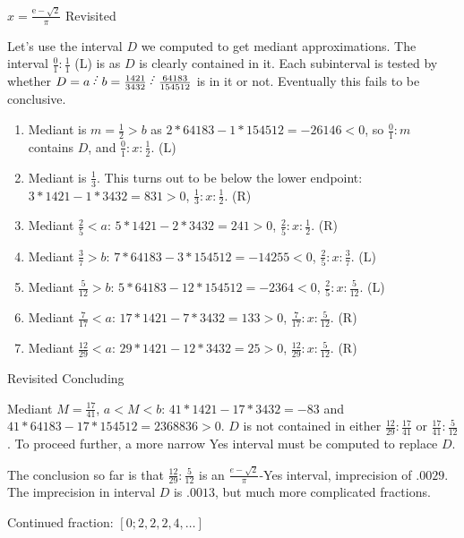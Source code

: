 \documentclass{beamer}
\begin{document}
\begin{frame}{$x = \frac{\mathrm{e} -\sqrt{2}}{\pi}$ Revisited}

Let's use the interval $D$ we computed to get mediant approximations. The interval $\frac{0}{1}:\frac{1}{1}$ (L) is as $D$ is clearly contained in it. Each subinterval is tested by whether $D= a\lte b =  \frac{1421}{3432} \lte \frac{64183}{154512}$ is in it or not. Eventually this fails to be conclusive. 

\begin{enumerate}
\item Mediant is $m = \frac{1}{2} > b$ as $2*64183 - 1*154512 = -26146 < 0$,  so $\frac{0}{1}:m$ contains $D$, and $\frac{0}{1}: x :\frac{1}{2}$. (L)
\item Mediant is $\frac{1}{3}$. This turns out to be below the lower endpoint:  $3*1421 - 1*3432 = 831>0$,   $\frac{1}{3}: x : \frac{1}{2}$. (R)
\item Mediant $\frac{2}{5} < a$: $5*1421 - 2*3432 = 241 > 0$, $\frac{2}{5}: x:\frac{1}{2}$. (R)
\item Mediant $\frac{3}{7} > b$: $7*64183- 3*154512 = -14255 < 0$, $\frac{2}{5}: x :\frac{3}{7}$. (L)
\item Mediant  $\frac{5}{12} > b$: $5*64183 - 12*154512 = -2364 < 0$, $\frac{2}{5}: x : \frac{5}{12}$. (L)
\item Mediant $\frac{7}{17}< a$: $17*1421 - 7*3432 = 133 > 0$, $\frac{7}{17}: x : \frac{5}{12}$. (R)
\item Mediant $\frac{12}{29}<a$: $29*1421 - 12*3432 = 25 > 0$, $\frac{12}{29}: x : \frac{5}{12}$. (R)

\end{enumerate}

\end{frame}

\begin{frame}{Revisited Concluding}
    
Mediant $M = \frac{17}{41}$, $a < M < b$: $41*1421-17*3432 = -83$ and $41*64183-17*154512 = 2368836 >0$. $D$ is not contained in either $\frac{12}{29}: \frac{17}{41}$ or $\frac{17}{41}:\frac{5}{12}$. To proceed further, a more narrow Yes interval must be computed to replace $D$. 

The conclusion so far is that $\frac{12}{29}: \frac{5}{12}$ is an $\frac{e-\sqrt{2}}{\pi}$-Yes interval,  imprecision of $.0029$.  The imprecision in interval $D$ is $.0013$, but much more complicated fractions. 

Continued fraction:  $[0; 2, 2, 2, 4,\ldots]$
    
\end{frame}
\end{document}
